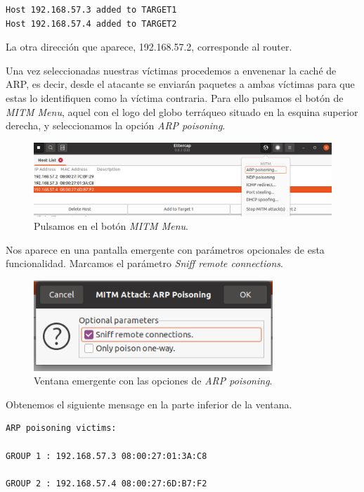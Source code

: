 \documentclass[11pt]{article}
\begin{document}
\begin{Verbatim}
Host 192.168.57.3 added to TARGET1
Host 192.168.57.4 added to TARGET2
\end{Verbatim}

La otra dirección que aparece, 192.168.57.2, corresponde al router.

Una vez seleccionadas nuestras víctimas procedemos a envenenar la caché de ARP, es decir, desde el atacante se enviarán paquetes a ambas víctimas para que estas lo identifiquen como la víctima contraria. Para ello pulsamos el botón de \textit{MITM Menu}, aquel con el logo del globo terráqueo situado en la esquina superior derecha, y seleccionamos la opción \textit{ARP poisoning}. 

\begin{figure}[H]
	\centering
	\includegraphics[width=140mm]{images/ettercap-mitm-arp-poisoning}
	\caption{Pulsamos en el botón \textit{MITM Menu}.}
	\label{fig:host-list}
\end{figure}

Nos aparece en una pantalla emergente con parámetros opcionales de esta funcionalidad. Marcamos el parámetro \textit{Sniff remote connections}.

\begin{figure}[H]
	\centering
	\includegraphics[width=90mm]{images/ettercap-arp-poisoning}
	\caption{Ventana emergente con las opciones de \textit{ARP poisoning}.}
	\label{fig:host-list}
\end{figure}

Obtenemos el siguiente mensage en la parte inferior de la ventana.

\begin{Verbatim}[tabsize=4]
ARP poisoning victims:

GROUP 1 : 192.168.57.3 08:00:27:01:3A:C8

GROUP 2 : 192.168.57.4 08:00:27:6D:B7:F2
\end{Verbatim}
\end{document}
